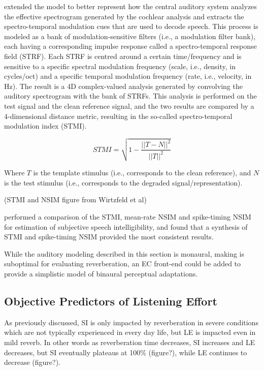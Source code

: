 \cite{zilany2007predictions} extended the model to better represent how the central auditory system analyzes the effective spectrogram generated by the cochlear analysis and extracts the spectro-temporal modulation cues that are used to decode speech. This process is modeled as a bank of modulation-sensitive filters (i.e., a modulation filter bank), each having a corresponding impulse response called a spectro-temporal response field (STRF). Each STRF is centred around a certain time/frequency and is sensitive to a specific spectral modulation frequency (scale, i.e., density, in cycles/oct) and a specific temporal modulation frequency (rate, i.e., velocity, in Hz). The result is a 4D complex-valued analysis generated by convolving the auditory spectrogram with the bank of STRFs. This analysis is performed on the test signal and the clean reference signal, and the two results are compared by a 4-dimensional distance metric, resulting in the so-called spectro-temporal modulation index (STMI).

\[STMI=\sqrt{1-\frac{||T-N||^2}{||T||^2}}\]

Where $T$ is the template stimulus (i.e., corresponds to the clean reference), and $N$ is the test stimulus (i.e., corresponds to the degraded signal/representation).

(STMI and NSIM figure from Wirtzfeld et al)

\cite{wirtzfeld2017predictions} performed a comparison of the STMI, mean-rate NSIM and spike-timing NSIM for estimation of subjective speech intelligibility, and found that a synthesis of STMI and spike-timing NSIM provided the most consistent results. 

While the auditory modeling described in this section is monaural, making is suboptimal for evaluating reverberation, an EC front-end could be added to provide a simplistic model of binaural perceptual adaptations.


\subsection {Objective Predictors of Listening Effort}

As previously discussed, SI is only impacted by reverberation in severe conditions which are not typically experienced in every day life, but LE is impacted even in mild reverb. In other words as reverberation time decreases, SI increases and LE decreases, but SI eventually plateaus at 100\% (figure?), while LE continues to decrease (figure?). 

